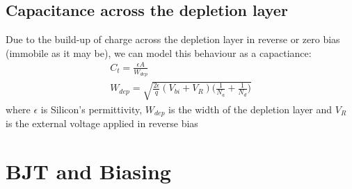 \documentclass[12pt]{article}
\begin{document}
\subsection{Capacitance across the depletion layer}
Due to the build-up of charge across the depletion layer in reverse or zero bias (immobile as it may be), we can model this behaviour as a capactiance:
\begin{align}
    C_{t}=\frac{\epsilon A}{W_{dep}}\\
    W_{dep}=\sqrt{\frac{2\epsilon}{q}(V_{bi}+V_{R})\big(\frac{1}{N_a}+\frac{1}{N_d}\big)}
\end{align}
where $\epsilon$ is Silicon's permittivity, $W_{dep}$ is the width of the depletion layer and $V_R$ is the external voltage applied in reverse bias


\section{BJT and Biasing}

\rarr
\end{document}
